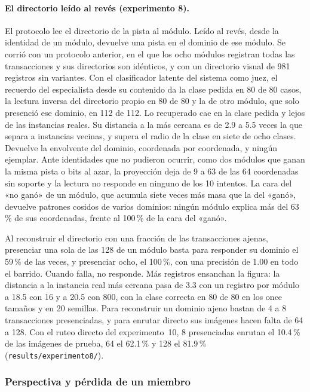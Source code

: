 \paragraph{El directorio leído al revés (experimento 8).}
El protocolo lee el directorio de la pista al módulo.
Leído al revés, desde la identidad de un módulo, devuelve una pista en el dominio de ese
módulo.
Se corrió con un protocolo anterior, en el que los ocho módulos registran todas las
transacciones y sus directorios son idénticos, y con un directorio visual de 981
registros sin variantes.
Con el clasificador latente del sistema como juez, el recuerdo del especialista desde su
contenido da la clase pedida en 80 de 80 casos, la lectura inversa del directorio propio
en 80 de 80 y la de otro módulo, que solo presenció ese dominio, en 112 de 112.
Lo recuperado cae en la clase pedida y lejos de las instancias reales.
Su distancia a la más cercana es de 2.9 a 5.5 veces la que separa a instancias vecinas,
y supera el radio de la clase en siete de ocho clases.
Devuelve la envolvente del dominio, coordenada por coordenada, y ningún ejemplar.
Ante identidades que no pudieron ocurrir, como dos módulos que ganan la misma pista o
bits al azar, la proyección deja de 9 a 63 de las 64 coordenadas sin soporte y la
lectura no responde en ninguno de los 10 intentos.
La cara del «no ganó» de un módulo, que acumula siete veces más masa que la del «ganó»,
devuelve patrones cosidos de varios dominios: ningún módulo explica más del 63\,\% de
sus coordenadas, frente al 100\,\% de la cara del «ganó».

Al reconstruir el directorio con una fracción de las transacciones ajenas, presenciar
una sola de las 128 de un módulo basta para responder su dominio el 59\,\% de las
veces, y presenciar ocho, el 100\,\%, con una precisión de 1.00 en todo el barrido.
Cuando falla, no responde.
Más registros ensanchan la figura: la distancia a la instancia real más cercana pasa de
3.3 con un registro por módulo a 18.5 con 16 y a 20.5 con 800, con la clase correcta en
80 de 80 en los once tamaños y en 20 semillas.
Para reconstruir un dominio ajeno bastan de 4 a 8 transacciones presenciadas, y para
enrutar directo sus imágenes hacen falta de 64 a 128.
Con el ruteo directo del experimento~10, 8 presenciadas enrutan el 10.4\,\% de las
imágenes de prueba, 64 el 62.1\,\% y 128 el 81.9\,\% (\texttt{results/experimento8/}).

\subsubsection{Perspectiva y pérdida de un miembro}
\label{sec:fase4-perspectiva}

